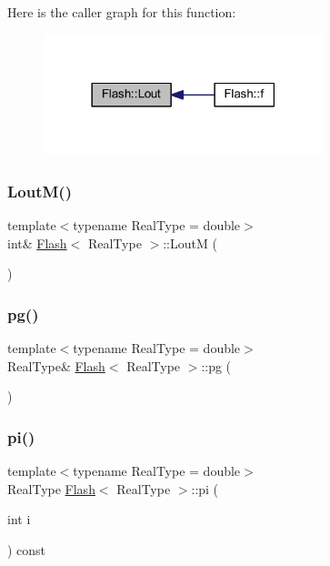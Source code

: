 Here is the caller graph for this function\+:\nopagebreak
\begin{figure}[H]
\begin{center}
\leavevmode
\includegraphics[width=230pt]{class_flash_a1c6d0596f0a6dbdd7b391ab85772b2d4_icgraph}
\end{center}
\end{figure}
\mbox{\label{class_flash_af0ad1baa628d2d891c036cefe7fb8a48}} 
\subsubsection{\texorpdfstring{Lout\+M()}{LoutM()}}
{\footnotesize\ttfamily template$<$typename Real\+Type = double$>$ \\
int\& \mbox{\hyperlink{class_flash}{Flash}}$<$ Real\+Type $>$\+::LoutM (\begin{DoxyParamCaption}{ }\end{DoxyParamCaption})\hspace{0.3cm}{\ttfamily [inline]}}

\mbox{\label{class_flash_a7e75d64415f5fd5dcb16fb0b8e5d4f40}} 
\subsubsection{\texorpdfstring{pg()}{pg()}}
{\footnotesize\ttfamily template$<$typename Real\+Type = double$>$ \\
Real\+Type\& \mbox{\hyperlink{class_flash}{Flash}}$<$ Real\+Type $>$\+::pg (\begin{DoxyParamCaption}{ }\end{DoxyParamCaption})\hspace{0.3cm}{\ttfamily [inline]}}

\mbox{\label{class_flash_a7a00a2495097cc7d45ee1f61b512829d}} 
\subsubsection{\texorpdfstring{pi()}{pi()}}
{\footnotesize\ttfamily template$<$typename Real\+Type = double$>$ \\
Real\+Type \mbox{\hyperlink{class_flash}{Flash}}$<$ Real\+Type $>$\+::pi (\begin{DoxyParamCaption}\item[{int}]{i }\end{DoxyParamCaption}) const\hspace{0.3cm}{\ttfamily [inline]}}

